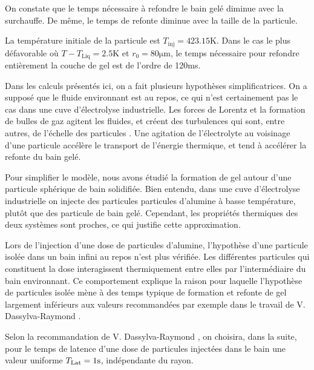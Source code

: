 On constate que le temps nécessaire à refondre le bain gelé
diminue avec la surchauffe. De même, le temps de refonte diminue avec
la taille de la particule.

La température initiale de la particule est $T_\text{inj} =
423.15\si{\kelvin}$. Dans le cas le plus défavorable où $T -
T_\text{Liq} = 2.5\si{\kelvin}$ et $r_0 = 80\si{\micro\meter}$, le
temps nécessaire pour refondre entièrement la couche de gel est de
l'ordre de 120\si{\milli\second}.

Dans les calculs présentés ici, on a fait plusieurs hypothèses
simplificatrices. On a supposé que le fluide environnant est au
repos, ce qui n'est certainement pas le cas dans une cuve
d'électrolyse industrielle. Les forces de Lorentz et la formation de
bulles de gaz agitent les fluides, et créent des turbulences qui sont,
entre autres, de l'échelle des particules \cite{Rochat2016}. Une
agitation de l'électrolyte au voisinage d'une particule accélère le
transport de l'énergie thermique, et tend à accélérer la refonte du
bain gelé.

Pour simplifier le modèle, nous avons étudié la formation de gel
autour d'une particule sphérique de bain solidifiée. Bien entendu,
dans une cuve d'électrolyse industrielle on injecte des particules
particules d'alumine à basse température, plutôt que des particule de
bain gelé. Cependant, les propriétés thermiques des deux systèmes sont
proches, ce qui justifie cette approximation.

Lors de l'injection d'une dose de particules d'alumine, l'hypothèse
d'une particule isolée dans un bain infini au repos n'est plus
vérifiée. Les différentes particules qui constituent la dose
interagissent thermiquement entre elles par l'intermédiaire du bain
environnant. Ce comportement explique la raison pour laquelle
l'hypothèse de particules isolée mène à des temps typique de
formation et refonte de gel largement inférieurs aux valeurs
recommandées par exemple dans le travail de V. Dassylva-Raymond \cite{Dassylva2015}.

Selon la recommandation de V. Dassylva-Raymond \cite{Dassylva2015}, on
choisira, dans la suite, pour le temps de latence d'une dose de
particules injectées dans le bain une valeur uniforme $T_\text{Lat} =
1\si{\second}$, indépendante du rayon.
